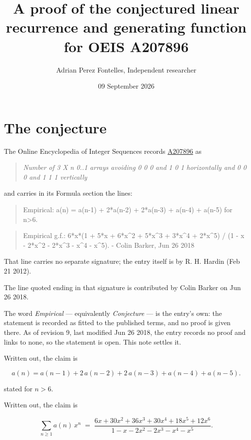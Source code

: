 \documentclass[11pt]{article}
\title{A proof of the conjectured linear recurrence and generating function for OEIS A207896}
\author{Adrian Perez Fontelles, Independent researcher}
\date{09 September 2026}
\theoremstyle{definition}
\begin{document}
\maketitle
\section{The conjecture}

The Online Encyclopedia of Integer Sequences records \href{https://oeis.org/A207896}{A207896} as

\begin{quote}\itshape Number of 3 X n 0..1 arrays avoiding 0 0 0 and 1 0 1 horizontally and 0 0 0 and 1 1 1 vertically\end{quote}

and carries in its Formula section the lines:

\begin{quote}\ttfamily Empirical: a(n) = a(n-1) + 2*a(n-2) + 2*a(n-3) + a(n-4) + a(n-5) for n>6.\end{quote}

\begin{quote}\ttfamily Empirical g.f.: 6*x*(1 + 5*x + 6*x\textasciicircum{}2 + 5*x\textasciicircum{}3 + 3*x\textasciicircum{}4 + 2*x\textasciicircum{}5) / (1 - x - 2*x\textasciicircum{}2 - 2*x\textasciicircum{}3 - x\textasciicircum{}4 - x\textasciicircum{}5). - Colin Barker, Jun 26 2018\end{quote}

That line carries no separate signature; the entry itself is by R. H. Hardin (Feb 21 2012).

The line quoted ending in that signature is contributed by Colin Barker on Jun 26 2018.

The word {\itshape Empirical} --- equivalently {\itshape Conjecture} --- is the entry's own: the statement is recorded as fitted to the published terms, and no proof is given there. As of revision 9, last modified Jun 26 2018, the entry records no proof and links to none, so the statement is open. This note settles it.

Written out, the claim is

\[a(n) = a(n-1) + 2\,a(n-2) + 2\,a(n-3) + a(n-4) + a(n-5).\]

stated for $n > 6$.

Written out, the claim is

\[\sum_{n \ge 1} a(n)\,x^n \;=\; \frac{6x + 30x^{2} + 36x^{3} + 30x^{4} + 18x^{5} + 12x^{6}}{1 - x - 2x^{2} - 2x^{3} - x^{4} - x^{5}}.\]
\end{document}
